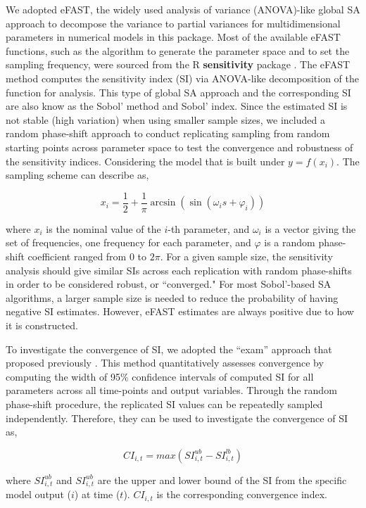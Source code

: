 \documentclass[preprint,12pt, a4paper]{elsarticle}
\begin{document}
We adopted eFAST, the widely used analysis of variance (ANOVA)-like global SA approach to decompose the variance to partial variances for multidimensional parameters in numerical models in this package. Most of the available eFAST functions, such as the algorithm to generate the parameter space and to set the sampling frequency, were sourced from the R \textbf{sensitivity} package \cite{R-sensitivity}. The eFAST method computes the sensitivity index (SI) via ANOVA-like decomposition of the function for analysis. This type of global SA approach and the corresponding SI are also know as the Sobol' method and Sobol' index. Since the estimated SI is not stable (high variation) when using smaller sample sizes, we included a random phase-shift approach to conduct replicating sampling from random starting points across parameter space to test the convergence and robustness of the sensitivity indices. Considering the model that is built under \(y=f(x_{i})\). The sampling scheme can describe as,

\[ x_i = \frac{1}{2} + \frac{1}{\pi}\arcsin(\sin(\omega_is + \varphi_i)) \]

where \(x_i\) is the nominal value of the \(i\)-th parameter, and \(\omega_i\) is a vector giving the set of frequencies, one frequency for each parameter, and \(\varphi\) is a random phase-shift coefficient
ranged from 0 to \(2\pi\). For a given sample size, the sensitivity analysis should give similar SIs across each replication with random phase-shifts in order to be considered robust, or ``converged." For most Sobol'-based SA algorithms, a larger sample size is needed to reduce the probability of having negative SI estimates. However, eFAST estimates are always positive due to how it is constructed.

To investigate the convergence of SI, we adopted the ``exam'' approach that proposed previously \cite{sarrazin2016global}. This method quantitatively assesses convergence by computing the width of 95\% confidence intervals of computed SI for all parameters across all time-points and output variables. Through the random phase-shift procedure, the replicated SI values can be repeatedly sampled independently. Therefore, they can be used to investigate the convergence of SI as,

\[CI_{i,t} = max(SI_{i,t}^{ub}-SI_{i,t}^{lb})\]

where \(SI_{i,t}^{ub}\) and \(SI_{i,t}^{ub}\) are the upper and lower bound of the SI from the specific model output (\(i\)) at time (\(t\)). \(CI_{i,t}\) is the corresponding convergence index.
\end{document}
